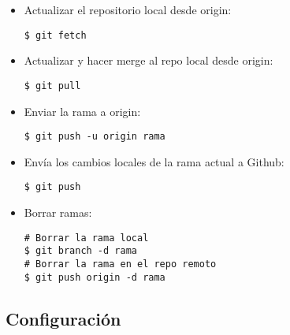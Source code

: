 \begin{itemize}[label=-]

\item Actualizar el repositorio local desde origin:
\begin{lstlisting}
$ git fetch
\end{lstlisting}

\item Actualizar y hacer merge al repo local desde origin:
\begin{lstlisting}
$ git pull
\end{lstlisting}

\item Enviar la rama a origin:
\begin{lstlisting}
$ git push -u origin rama
\end{lstlisting}

\item Envía los cambios locales de la rama actual a Github:
\begin{lstlisting}
$ git push
\end{lstlisting}

\item Borrar ramas:
\begin{lstlisting}
# Borrar la rama local
$ git branch -d rama
# Borrar la rama en el repo remoto
$ git push origin -d rama
\end{lstlisting}
\end{itemize}


\subsection{Configuración}

